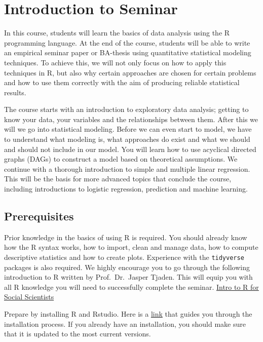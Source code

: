 \documentclass[
]{book}
\begin{document}
\hypertarget{intro-sem}{%
\chapter{Introduction to Seminar}\label{intro-sem}}

In this course, students will learn the basics of data analysis using the R programming language. At the end of the course, students will be able to write an empirical seminar paper or BA-thesis using quantitative statistical modeling techniques. To achieve this, we will not only focus on how to apply this techniques in R, but also why certain approaches are chosen for certain problems and how to use them correctly with the aim of producing reliable statistical results.

The course starts with an introduction to exploratory data analysis; getting to know your data, your variables and the relationships between them. After this we will we go into statistical modeling. Before we can even start to model, we have to understand what modeling is, what approaches do exist and what we should and should not include in our model. You will learn how to use acyclical directed graphs (DAGs) to construct a model based on theoretical assumptions. We continue with a thorough introduction to simple and multiple linear regression. This will be the basis for more advanced topics that conclude the course, including introductions to logistic regression, prediction and machine learning.

\hypertarget{prerequisites}{%
\section{Prerequisites}\label{prerequisites}}

Prior knowledge in the basics of using R is required. You should already know how the R syntax works, how to import, clean and manage data, how to compute descriptive statistics and how to create plots. Experience with the \texttt{tidyverse} packages is also required.
We highly encourage you to go through the following introduction to R written by Prof.~Dr.~Jasper Tjaden. This will equip you with all R knowledge you will need to successfully complete the seminar.
\href{https://jaspertjaden.github.io/course-intro2r/}{Intro to R for Social Scientists}

Prepare by installing R and Rstudio. Here is a \href{https://rstudio-education.github.io/hopr/starting.html}{link} that guides you through the installation process. If you already have an installation, you should make sure that it is updated to the most current versions.
\end{document}
